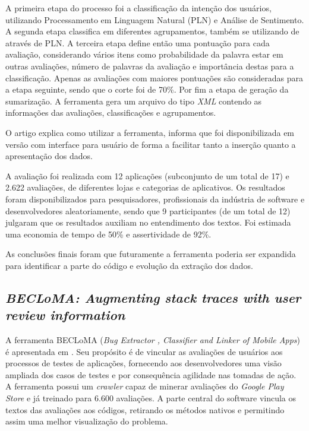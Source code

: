 A primeira etapa do processo foi a classificação da intenção dos usuários, utilizando Processamento em Linguagem Natural (PLN) e Análise de Sentimento.
A segunda etapa classifica em diferentes agrupamentos, também se utilizando de através de PLN.
A terceira etapa define então uma pontuação para cada avaliação, considerando vários itens como probabilidade da palavra estar em outras avaliações, número de palavras da avaliação e importância destas para a classificação. Apenas as avaliações com maiores pontuações são consideradas para a etapa seguinte, sendo que o corte foi de 70\%.
Por fim a etapa de geração da sumarização. A ferramenta gera um arquivo do tipo \textit{XML} contendo as informações das avaliações, classificações e agrupamentos.

O artigo explica como utilizar a ferramenta, informa que foi disponibilizada em versão com interface para usuário de forma a facilitar tanto a inserção quanto a apresentação dos dados. 

A avaliação foi realizada com 12 aplicações (subconjunto de um total de 17) e 2.622 avaliações, de diferentes lojas e categorias de aplicativos.
Os resultados foram disponibilizados para pesquisadores, profissionais da indústria de software e desenvolvedores aleatoriamente, sendo que 9 participantes (de um total de 12) julgaram que os resultados auxiliam no entendimento dos textos. Foi estimada uma economia de tempo de 50\% e assertividade de 92\%.

As conclusões finais foram que futuramente a ferramenta poderia ser expandida para identificar a parte do código e evolução da extração dos dados.

\subsection{\textit{BECLoMA: Augmenting stack traces with user review information}}
A ferramenta BECLoMA (\textit{Bug Extractor , Classifier and Linker of Mobile Apps}) é apresentada em \cite{Pelloni2018becloma}. Seu propósito é de vincular as avaliações de usuários aos processos de testes de aplicações, fornecendo aos desenvolvedores uma visão ampliada dos casos de testes e por consequência agilidade nas tomadas de ação. A ferramenta possui um \textit{crawler} capaz de minerar avaliações do \textit{Google Play Store} e já treinado para 6.600 avaliações. A parte central do software vincula os textos das avaliações aos códigos, retirando os métodos nativos e permitindo assim uma melhor visualização do problema.

